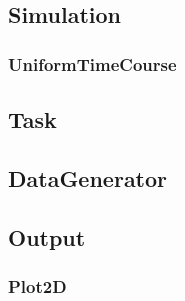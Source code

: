
 \subsection{Simulation}
 

 \subsubsection{UniformTimeCourse}
 

%

%


 \subsection{Task}
 


 \subsection{DataGenerator}
 


\subsection{Output}


\subsubsection{Plot2D}


